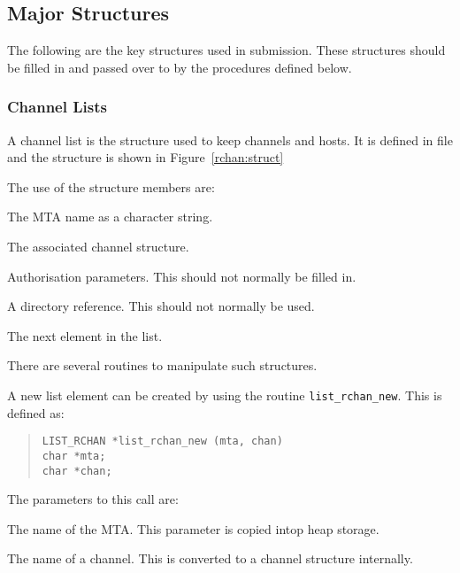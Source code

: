 \subsection {Major Structures}

The following are the key structures used in submission. These
structures should be filled in and passed over to  by the
procedures defined below.

\subsubsection{Channel Lists}

A channel list is the structure used to keep channels and hosts. It is
defined in file  and the structure is shown in
Figure~\ref{rchan:struct}


The use of the structure members are:
\begin{describe}
\item[\verb|li\_mta|:] The MTA name as a character string.
\item[\verb|li\_chan|:] The associated channel structure.
\item[\verb|li\_auth|:] Authorisation parameters. This should not
normally be filled in.
\item[\verb|li\_dir|:] A directory reference. This should not normally
be used.
\item[\verb|li\_next|:] The next element in the list.
\end{describe}

There are several routines to manipulate such structures.


A new list element can be created by using the routine
\verb|list_rchan_new|. This is defined as:
\begin{quote}\begin{verbatim}
LIST_RCHAN *list_rchan_new (mta, chan)
char *mta;
char *chan;
\end{verbatim}\end{quote}
The parameters to this call are:
\begin{describe}
\item[\verb|mta|:] The name of the MTA. This parameter is copied intop
heap storage.
\item[\verb|chan|:] The name of a channel. This is converted to a
channel structure internally.
\end{describe}

